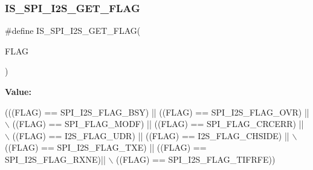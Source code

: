 \subsubsection{\texorpdfstring{I\+S\+\_\+\+S\+P\+I\+\_\+\+I2\+S\+\_\+\+G\+E\+T\+\_\+\+F\+L\+AG}{IS\_SPI\_I2S\_GET\_FLAG}}
{\footnotesize\ttfamily \#define I\+S\+\_\+\+S\+P\+I\+\_\+\+I2\+S\+\_\+\+G\+E\+T\+\_\+\+F\+L\+AG(\begin{DoxyParamCaption}\item[{}]{F\+L\+AG }\end{DoxyParamCaption})}

{\bfseries Value\+:}
\begin{DoxyCode}
(((FLAG) == SPI\_I2S\_FLAG\_BSY) || ((FLAG) == SPI\_I2S\_FLAG\_OVR) || \(\backslash\)
                                   ((FLAG) == SPI\_FLAG\_MODF) || ((FLAG) == SPI\_FLAG\_CRCERR) || \(\backslash\)
                                   ((FLAG) == I2S\_FLAG\_UDR) || ((FLAG) == I2S\_FLAG\_CHSIDE) || \(\backslash\)
                                   ((FLAG) == SPI\_I2S\_FLAG\_TXE) || ((FLAG) == SPI\_I2S\_FLAG\_RXNE)|| \(\backslash\)
                                   ((FLAG) == SPI\_I2S\_FLAG\_TIFRFE))
\end{DoxyCode}
